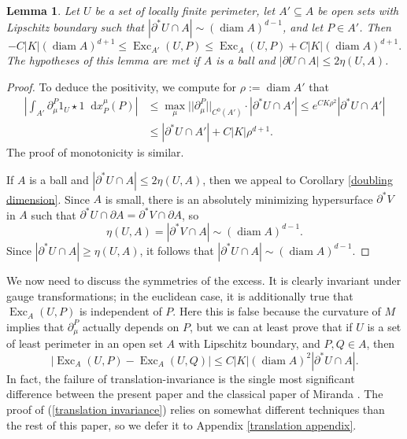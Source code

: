 \documentclass[reqno,10pt]{amsart}
\DeclareMathOperator{\diam}{diam}
\DeclareMathOperator{\Exc}{Exc}
\newcommand*\dif{\mathop{}\!\mathrm{d}}
\newtheorem{lemma}[theorem]{Lemma}
\theoremstyle{definition}
\numberwithin{equation}{section}
\begin{document}
\begin{lemma}
Let $U$ be a set of locally finite perimeter, let $A' \subseteq A$ be open sets with Lipschitz boundary such that $|\partial^* U \cap A| \sim (\diam A)^{d - 1}$,
and let $P \in A'$. Then
\begin{equation}\label{approximate monotone}
-C |K| (\diam A)^{d + 1} \leq \Exc_{A'}(U, P) \leq \Exc_A(U, P) + C |K|(\diam A)^{d + 1}.
\end{equation}
The hypotheses of this lemma are met if $A$ is a ball and $|\partial U \cap A| \leq 2\eta(U, A)$.
\end{lemma}
\begin{proof}
To deduce the positivity, we compute for $\rho := \diam A'$ that
\begin{align*}
    \left|\int_{A'} \partial^P_\mu 1_U \star 1 \dif x_P^\mu(P)\right|
 & \leq \max_\mu ||\partial^P_\mu||_{C^0(A')} \cdot |\partial^* U \cap A'| \leq e^{CK\rho^2} |\partial^* U \cap A'| \\
 & \leq |\partial^* U \cap A'| + C|K|\rho^{d + 1}.
\end{align*}
The proof of monotonicity is similar.

If $A$ is a ball and $|\partial^* U \cap A| \leq 2\eta(U, A)$, then we appeal to Corollary \ref{doubling dimension}.
Since $A$ is small, there is an absolutely minimizing hypersurface $\partial^* V$ in $A$ such that $\partial^* U \cap \partial A = \partial^* V \cap \partial A$, so
$$\eta(U, A) = |\partial^* V \cap A| \sim (\diam A)^{d - 1}.$$
Since $|\partial^* U \cap A| \geq \eta(U, A)$, it follows that $|\partial^* U \cap A| \sim (\diam A)^{d - 1}$.
\end{proof}

We now need to discuss the symmetries of the excess.
It is clearly invariant under gauge transformations; in the euclidean case, it is additionally true that $\Exc_A(U, P)$ is independent of $P$.
Here this is false because the curvature of $M$ implies that $\partial_\mu^P$ actually depends on $P$, but we can at least prove that if $U$ is a set of least perimeter in an open set $A$ with Lipschitz boundary, and $P, Q \in A$, then
\begin{equation}\label{translation invariance}
|\Exc_A(U, P) - \Exc_A(U, Q)| \leq C|K|(\diam A)^2 |\partial^* U \cap A|.
\end{equation}
In fact, the failure of translation-invariance is the single most significant difference between the present paper and the classical paper of Miranda \cite{Miranda66}.
The proof of (\ref{translation invariance}) relies on somewhat different techniques than the rest of this paper, so we defer it to Appendix \ref{translation appendix}.
\end{document}
